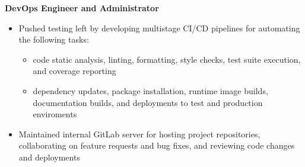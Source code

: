 \documentclass[a4paper]{article}
\begin{document}
\noindent
\hspace{0.120in}
\textbf{DevOps Engineer and Administrator}
\smallskip

\begin{itemize}
  \item Pushed testing left by developing multistage CI/CD pipelines for automating the
        following tasks:
        \begin{itemize}
          \item code static analysis, linting, formatting, style checks, test suite
                execution, and coverage reporting
          \item dependency updates, package installation, runtime image builds,
                documentation builds, and deployments to test and production enviroments
        \end{itemize}
  \item Maintained internal GitLab server for hosting project repositories, collaborating on feature requests and bug fixes, and reviewing code changes and deployments
        
\end{itemize}
\end{document}
